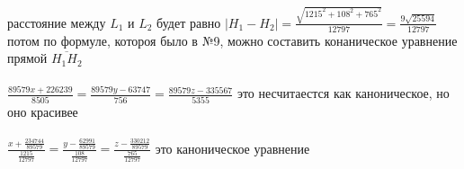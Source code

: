 \documentclass{article}
\newcommand{\ds}{\displaystyle}
\newcommand{\abs}[1]{\left|#1\right|}
\begin{document}
  расстояние между $L_1$ и $L_2$ будет равно
  $\ds \abs{H_1 - H_2} = \frac{\sqrt{1215^2 + 108^2 + 765^2}}{12797} = \frac{9\sqrt{25594}}{12797}$ \\
  потом по формуле, котороя было в №9, можно составить конаническое уравнение прямой $\overline{H_1H_2}$ \\ \\
  \(\ds
    \frac{89579 x + 226239}{8505} =
    \frac{89579 y - 63747}{756} =
    \frac{89579 z - 335567}{5355}
  \) это несчитаестся как каноническое, но оно красивее \\ \\
  \(\ds
    \frac{x + \frac{234744}{89579}}{\frac{1215}{12797}} =
    \frac{y - \frac{62991}{89579}}{\frac{108}{12797}} =
    \frac{z - \frac{330212}{89579}}{\frac{765}{12797}}
  \) это каноническое уравнение
\end{document}
